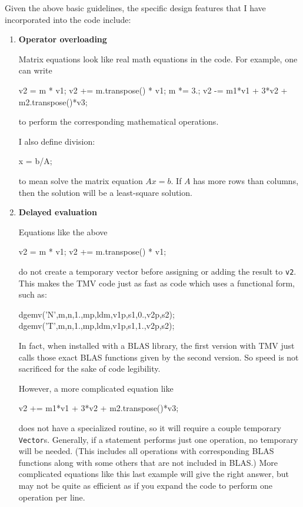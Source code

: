 \documentclass[twoside,letterpaper,11pt]{article}
\renewcommand{\tt}[1]{{\lstinline {#1}}}
\begin{document}
Given the above basic guidelines, the specific design features that I 
have incorporated into the code include:

\begin{enumerate}
\item
\textbf{Operator overloading}

Matrix equations look like real math equations in the code. 
For example, one can write 
\begin{tmvcode}
v2 = m * v1;
v2 += m.transpose() * v1;
m *= 3.;
v2 -= m1*v1 + 3*v2 + m2.transpose()*v3;
\end{tmvcode}
to perform the corresponding mathematical operations.

I also define division:
\begin{tmvcode}
x = b/A;
\end{tmvcode}
to mean solve the matrix equation $A x = b$.  If $A$ has more rows than columns,
then the solution will be a least-square solution.

\item
\textbf{Delayed evaluation}

Equations like the above 
\begin{tmvcode}
v2 = m * v1;
v2 += m.transpose() * v1;
\end{tmvcode}
do not create a temporary vector before assigning or adding the result to \tt{v2}.  This makes 
the TMV code just as fast as code which uses a functional form, such as:
\begin{tmvcode}
dgemv('N',m,n,1.,mp,ldm,v1p,s1,0.,v2p,s2);
dgemv('T',m,n,1.,mp,ldm,v1p,s1,1.,v2p,s2);
\end{tmvcode}
In fact, when installed with a BLAS library, the first version with TMV just calls those exact 
BLAS functions given by the second version.  
So speed is not sacrificed for the sake of code legibility.

However, a more complicated equation like
\begin{tmvcode}
v2 += m1*v1 + 3*v2 + m2.transpose()*v3;
\end{tmvcode}
does not have a specialized routine, 
so it will require a couple temporary \tt{Vector}s.
Generally, if a statement performs just one operation, no temporary will be needed.  
(This includes all operations with corresponding BLAS functions along with some others
that are not included in BLAS.)
More complicated equations like this last example will give the right answer, 
but may not be quite as efficient as if you expand
the code to perform one operation per line.


\end{enumerate}
\end{document}
